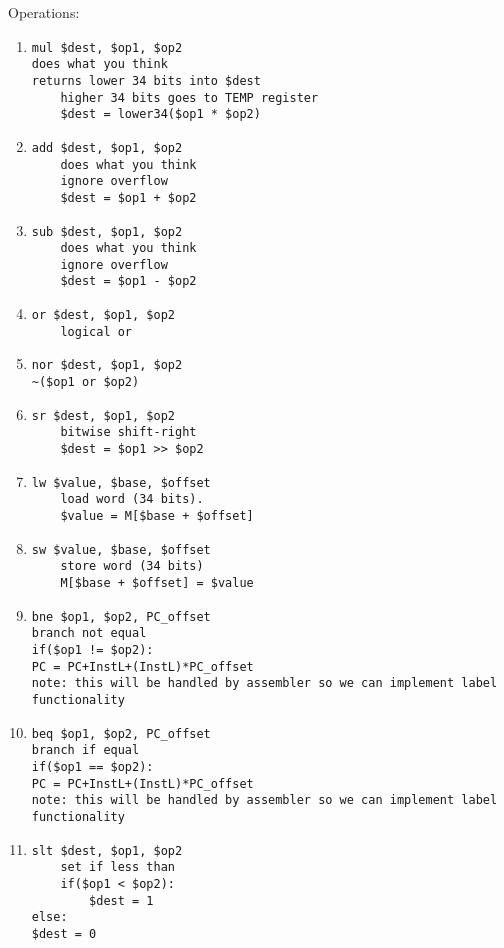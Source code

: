 \documentclass{article}
\begin{document}
Operations:
\begin{enumerate}
\item
\begin{verbatim}
mul $dest, $op1, $op2
does what you think
returns lower 34 bits into $dest
    higher 34 bits goes to TEMP register
    $dest = lower34($op1 * $op2)
\end{verbatim}
\item
\begin{verbatim}
add $dest, $op1, $op2
    does what you think
    ignore overflow
    $dest = $op1 + $op2

\end{verbatim}
\item
\begin{verbatim}
sub $dest, $op1, $op2
    does what you think
    ignore overflow
    $dest = $op1 - $op2

\end{verbatim}
\item
\begin{verbatim}
or $dest, $op1, $op2
    logical or

\end{verbatim}
\item
\begin{verbatim}
nor $dest, $op1, $op2
~($op1 or $op2)

\end{verbatim}
\item
\begin{verbatim}
sr $dest, $op1, $op2
    bitwise shift-right
    $dest = $op1 >> $op2

\end{verbatim}
\item
\begin{verbatim}
lw $value, $base, $offset
    load word (34 bits).
    $value = M[$base + $offset]

\end{verbatim}
\item
\begin{verbatim}
sw $value, $base, $offset
    store word (34 bits)
    M[$base + $offset] = $value

\end{verbatim}
\item
\begin{verbatim}
bne $op1, $op2, PC_offset
branch not equal
if($op1 != $op2):
PC = PC+InstL+(InstL)*PC_offset
note: this will be handled by assembler so we can implement label functionality

\end{verbatim}
\item
\begin{verbatim}
beq $op1, $op2, PC_offset
branch if equal
if($op1 == $op2):
PC = PC+InstL+(InstL)*PC_offset
note: this will be handled by assembler so we can implement label functionality

\end{verbatim}
\item
\begin{verbatim}
slt $dest, $op1, $op2
    set if less than
    if($op1 < $op2):
        $dest = 1
else:
$dest = 0
\end{verbatim}
\end{enumerate}
\end{document}
